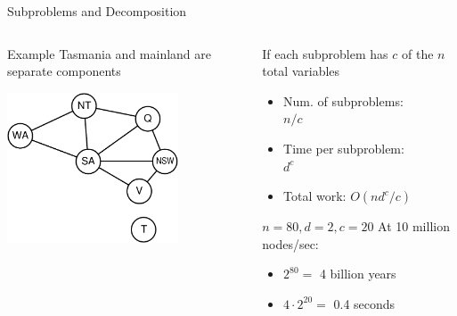 \documentclass[12pt]{beamer}
\begin{document}
\begin{frame}{Subproblems and Decomposition}
	\begin{columns}
		\begin{column}{2in}
			\begin{block}{Example}
				Tasmania and mainland are separate components
			\end{block}
			\includegraphics[width=2in]{australia-csp.pdf}
		\end{column}
		\begin{column}{2in}
			\begin{block}{If each subproblem has $c$ of the $n$ total variables}
				\begin{itemize}
					\pause\item Num. of subproblems:\\
					\pause\hspace{2em}$n/c$
					\pause\item Time per subproblem:\\
					\pause\hspace{2em}$d^c$
					\pause\item Total work: \pause$O(nd^c/c)$
				\end{itemize}
			\end{block}
			\pause
			\begin{block}{$n=80, d=2, c=20$}
				At 10 million nodes/sec:
				\begin{itemize}
					\item $2^{80} =$ 4 billion years 
					\item $4 \cdot 2^{20} =$ 0.4 seconds
				\end{itemize}
			\end{block}
		\end{column}
	\end{columns}
\end{frame}
\end{document}
